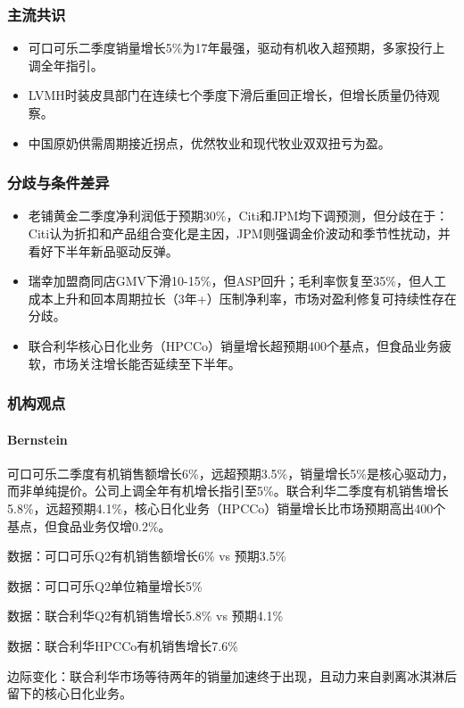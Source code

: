 \documentclass[11pt]{ctexart}
\begin{document}
\subsubsection*{主流共识}
\begin{itemize}
  \item 可口可乐二季度销量增长5\%为17年最强，驱动有机收入超预期，多家投行上调全年指引。
  \item LVMH时装皮具部门在连续七个季度下滑后重回正增长，但增长质量仍待观察。
  \item 中国原奶供需周期接近拐点，优然牧业和现代牧业双双扭亏为盈。
\end{itemize}
\subsubsection*{分歧与条件差异}
\begin{itemize}
  \item 老铺黄金二季度净利润低于预期30\%，Citi和JPM均下调预测，但分歧在于：Citi认为折扣和产品组合变化是主因，JPM则强调金价波动和季节性扰动，并看好下半年新品驱动反弹。
  \item 瑞幸加盟商同店GMV下滑10-15\%，但ASP回升；毛利率恢复至35\%，但人工成本上升和回本周期拉长（3年+）压制净利率，市场对盈利修复可持续性存在分歧。
  \item 联合利华核心日化业务（HPCCo）销量增长超预期400个基点，但食品业务疲软，市场关注增长能否延续至下半年。
\end{itemize}
\subsubsection*{机构观点}
\paragraph{Bernstein} 可口可乐二季度有机销售额增长6\%，远超预期3.5\%，销量增长5\%是核心驱动力，而非单纯提价。公司上调全年有机增长指引至5\%。联合利华二季度有机销售增长5.8\%，远超预期4.1\%，核心日化业务（HPCCo）销量增长比市场预期高出400个基点，但食品业务仅增0.2\%。
{\small\color{refgray}数据：可口可乐Q2有机销售额增长6\% vs 预期3.5\%\par}
{\small\color{refgray}数据：可口可乐Q2单位箱量增长5\%\par}
{\small\color{refgray}数据：联合利华Q2有机销售增长5.8\% vs 预期4.1\%\par}
{\small\color{refgray}数据：联合利华HPCCo有机销售增长7.6\%\par}
{\small\color{refgray}边际变化：联合利华市场等待两年的销量加速终于出现，且动力来自剥离冰淇淋后留下的核心日化业务。\par}
\end{document}
